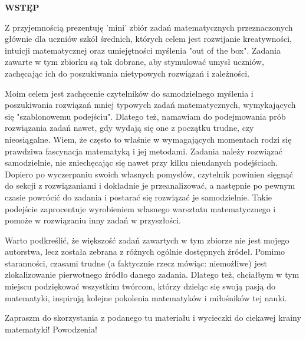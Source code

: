 \documentclass[a4paper,12pt, twoside]{article}
\theoremstyle{definition}
\begin{document}

\pagestyle{fancy}

\fancyfoot[L]{}
\fancyfoot[R]{}


\vspace*{2cm}

\begin{center}
    \textbf{\Huge  WSTĘP}
\end{center}

\vspace*{2cm}

\noindent  Z przyjemnością prezentuję 'mini' zbiór zadań matematycznych przeznaczonych głównie dla uczniów szkół średnich, których celem jest rozwijanie kreatywności, intuicji matematycznej oraz umiejętności myślenia "out of the box". Zadania zawarte w tym zbiorku są tak dobrane, aby stymulować umysł uczniów, zachęcając ich do poszukiwania nietypowych rozwiązań i zależności.

Moim celem jest zachęcenie czytelników do samodzielnego myślenia i poszukiwania rozwiązań mniej typowych zadań matematycznych, wymykających się "szablonowemu podejściu". Dlatego też, namawiam do podejmowania prób rozwiązania zadań nawet, gdy wydają się one z początku trudne, czy nieosiągalne. Wiem, że często to właśnie w wymagających momentach rodzi się prawdziwa fascynacja matematyką i jej metodami. Zadania należy rozwiązać samodzielnie, nie zniechęcając się nawet przy kilku nieudanych podejściach. Dopiero po wyczerpaniu swoich własnych pomysłów, czytelnik powinien sięgnąć do sekcji z rozwiązaniami i dokładnie je przeanalizować, a następnie po pewnym czasie powrócić do zadania i postarać się rozwiązać je samodzielnie. Takie podejście zaprocentuje wyrobieniem własnego warsztatu matematycznego i pomoże w rozwiązaniu inny zadań w przyszłości.

Warto podkreślić, że większość zadań zawartych w tym zbiorze nie jest mojego autorstwa, lecz została zebrana z różnych ogólnie dostępnych źródeł. Pomimo staranności, czasami trudne (a faktycznie rzecz mówiąc: niemożliwe) jest zlokalizowanie pierwotnego źródło danego zadania. Dlatego też, chciałbym w tym miejscu podziękować wszystkim twórcom, którzy dzieląc się swoją pasją do matematyki, inspirują kolejne pokolenia matematyków i miłośników tej nauki.

Zapraszm do skorzystania z podanego tu materiału i wycieczki do ciekawej krainy matematyki! Powodzenia! 
\end{document}
